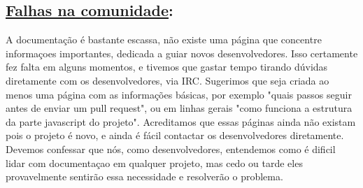 \subsection*{\underline{Falhas na comunidade}:}

A documentação é bastante escassa, não existe uma página que concentre informaçoes importantes, dedicada a guiar novos desenvolvedores. Isso certamente fez falta em alguns momentos, e tivemos que gastar tempo tirando dúvidas diretamente com os desenvolvedores, via IRC.
Sugerimos que seja criada ao menos uma página com as informações básicas, por exemplo "quais passos seguir antes de enviar um pull request", ou em linhas gerais "como funciona a estrutura da parte javascript do projeto".
Acreditamos que essas páginas ainda não existam pois o projeto é novo, e ainda é fácil contactar os desenvolvedores diretamente. Devemos confessar que nós, como desenvolvedores, entendemos como é dificil lidar com documentaçao em qualquer projeto, mas cedo ou tarde eles provavelmente sentirão essa necessidade e resolverão o problema.